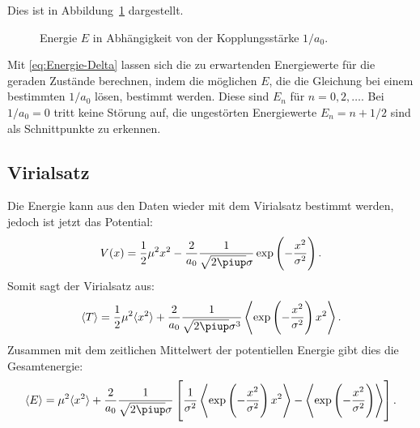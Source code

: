 Dies ist in Abbildung~\ref{fig:E_a0} dargestellt.

\begin{figure}[htbp]
    \centering
    \caption{%
        Energie $E$ in Abhängigkeit von der Kopplungsstärke $1/a_0$.
    }
    \label{fig:E_a0}
\end{figure}

Mit \eqref{eq:Energie-Delta} lassen sich die zu erwartenden Energiewerte für
die geraden Zustände berechnen, indem die möglichen $E$, die die Gleichung bei
einem bestimmten $1/a_0$ lösen, bestimmt werden. Diese sind $E_n$ für $n = 0,
2, \ldots$. Bei $1/a_0 = 0$ tritt keine Störung auf, die ungestörten
Energiewerte $E_n = n + 1/2$ sind als Schnittpunkte zu erkennen.



\subsection{Virialsatz}

Die Energie kann aus den Daten wieder mit dem Virialsatz bestimmt werden,
jedoch ist jetzt das Potential:
\[
    V(x) = \frac12 \mu^2 x^2 - \frac{2}{a_0} \frac1{\sqrt{2\piup}\sigma}
    \exp\del{-\frac{x^2}{\sigma^2}}.
\]
Somit sagt der Virialsatz aus:
\[
    \bracket T = \frac12 \mu^2 \bracket{x^2} + \frac{2}{a_0}
    \frac1{\sqrt{2\piup}\sigma^3} \Bracket{\exp\del{-\frac{x^2}{\sigma^2}}
    x^2}.
\]
Zusammen mit dem zeitlichen Mittelwert der potentiellen Energie gibt dies die
Gesamtenergie:
\[
    \bracket E = \mu^2 \bracket{x^2} + \frac{2}{a_0}
    \frac1{\sqrt{2\piup}\sigma} \sbr{\frac1{\sigma^2}
    \Bracket{\exp\del{-\frac{x^2}{\sigma^2}} x^2} -
    \Bracket{\exp\del{-\frac{x^2}{\sigma^2}}}}.
\]

